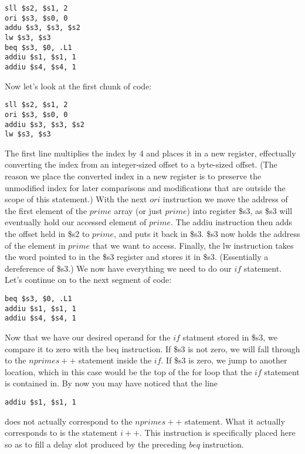\documentclass[11pt]{article}
\begin{document}
\begin{verbatim}
sll $s2, $s1, 2
ori $s3, $s0, 0
addu $s3, $s3, $s2
lw $s3, $s3
beq $s3, $0, .L1
addiu $s1, $s1, 1
addiu $s4, $s4, 1
\end{verbatim}

Now let's look at the first chunk of code:

\begin{verbatim}
sll $s2, $s1, 2
ori $s3, $s0, 0
addiu $s3, $s3, $s2
lw $s3, $s3
\end{verbatim}

The first line multiplies the index by 4 and places it in a new register, effectually converting the index from an integer-sized offset to a byte-sized offset. (The reason we place the converted index in a new register is to preserve the unmodified index for later comparisons and modifications that are outside the scope of this statement.) With the next $ori$ instruction we move the address of the first element of the $prime$ array (or just $prime$) into register \$s3, as \$s3 will eventually hold our accessed element of $prime$. The addiu instruction then adds the offset held in \$s2 to $prime$, and puts it back in \$s3. \$s3 now holds the address of the element in $prime$ that we want to access. Finally, the lw instruction takes the word pointed to in the \$s3 register and stores it in \$s3. (Essentially a dereference of \$s3.) We now have everything we need to do our $if$ statement. Let's continue on to the next segment of code:

\begin{verbatim}
beq $s3, $0, .L1
addiu $s1, $s1, 1
addiu $s4, $s4, 1
\end{verbatim}

Now that we have our desired operand for the $if$ statment stored in \$s3, we compare it to zero with the beq instruction. If \$s3 is not zero, we will fall through to the $nprimes++$ statement inside the $if$. If \$s3 is zero, we jump to another location, which in this case would be the top of the for loop that the $if$ statement is contained in. By now you may have noticed that the line

\begin{verbatim}
addiu $s1, $s1, 1
\end{verbatim}

does not actually correspond to the $nprimes++$ statement. What it actually corresponds to is the statement $i++$. This instruction is specifically placed here so as to fill a delay slot produced by the preceding $beq$ instruction.
\end{document}
